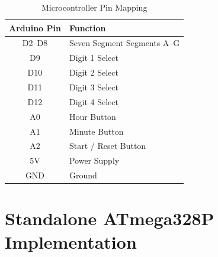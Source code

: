 \documentclass[12pt,a4paper]{article}
\begin{document}
\begin{table}[H]

\centering

\caption{Microcontroller Pin Mapping}

\begin{tabular}{|c|l|}

\hline

\textbf{Arduino Pin} & \textbf{Function}\\

\hline

D2--D8 & Seven Segment Segments A--G\\

\hline

D9 & Digit 1 Select\\

\hline

D10 & Digit 2 Select\\

\hline

D11 & Digit 3 Select\\

\hline

D12 & Digit 4 Select\\

\hline

A0 & Hour Button\\

\hline

A1 & Minute Button\\

\hline

A2 & Start / Reset Button\\

\hline

5V & Power Supply\\

\hline

GND & Ground\\

\hline

\end{tabular}

\end{table}


\section{Standalone ATmega328P Implementation}
\end{document}
